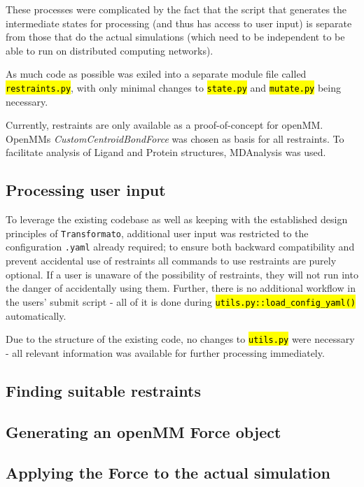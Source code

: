 \documentclass[oneside]{scrreprt}
\newcommand{\code}[1]{\texttt{\hl{#1}}}
\begin{document}
These processes were complicated by the fact that the script that generates the intermediate states for processing (and thus has access to user input) is separate from those that do the actual simulations (which need to be independent to be able to run on distributed computing networks).



 As much code as possible was exiled into a separate module file called \code{restraints.py}, with only minimal changes to \code{state.py} and \code{mutate.py} being necessary. 

Currently, restraints are only available as a proof-of-concept for openMM. OpenMMs \emph{CustomCentroidBondForce} was chosen as basis for all restraints. To facilitate analysis of Ligand and Protein structures, MDAnalysis\supercite{agrawal2011,oliver_beckstein-proc-scipy-2016} was used.

\subsection{Processing user input}
To leverage the existing codebase as well as keeping with the established design principles of \texttt{Transformato}, additional user input was restricted to the configuration \texttt{.yaml} already required; to ensure both backward compatibility and prevent accidental use of restraints all commands to use restraints are purely optional. If a user is unaware of the possibility of restraints, they will not run into the danger of accidentally using them. Further, there is no additional workflow in the users' submit script - all of it is done during \code{utils.py::load\_config\_yaml()} automatically.

Due to the structure of the existing code, no changes to \code{utils.py} were necessary - all relevant information was available for further processing immediately.
\subsection{Finding suitable restraints}

\subsection{Generating an openMM Force object}

\subsection{Applying the Force to the actual simulation}
\end{document}
